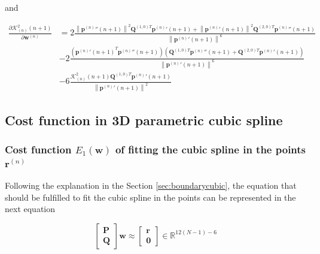 and

\begin{equation}\label{eq:curvature:der:K2nn1}
\begin{split}
\frac{
\partial 
\mathcal{K}_{(n)}^{2}(n+1)
}
{
\partial \mathbf{w}^{(n)}
}
& = 
2
\frac{
\left\|{\mathbf{p}^{(n)}}''(n+1)\right\|^2
\mathbf{Q}^{(1,0)T} {\mathbf{p}^{(n)}}'(n+1)
+
\left\|{\mathbf{p}^{(n)}}'(n+1)\right\|^2
\mathbf{Q}^{(2,0)T} {\mathbf{p}^{(n)}}''(n+1)
}
{\left\| {\mathbf{p}^{(n)}}'(n+1) \right\|^{6}}\\[10pt]
& - 
2
\frac
{
\left(
{{\mathbf{p}^{(n)}}'(n+1)}^{T}
{\mathbf{p}^{(n)}}''(n+1)
\right)
\left(
\mathbf{Q}^{(1,0)T}{\mathbf{p}^{(n)}}''(n+1)
+
\mathbf{Q}^{(2,0)T}{\mathbf{p}^{(n)}}'(n+1)
\right)
}
{\left\| {\mathbf{p}^{(n)}}'(n+1) \right\|^{6}}\\[10pt]
& - 
6
\frac
{
\mathcal{K}_{(n)}^{2}(n+1)
\mathbf{Q}^{(1,0)T}{\mathbf{p}^{(n)}}'(n+1)
}
{\left\| {\mathbf{p}^{(n)}}'(n+1) \right\|^{2}}
\end{split}
\end{equation}

\subsection{Cost function in 3D parametric cubic spline}

\subsubsection{Cost function $E_{1}(\mathbf{w})$ of fitting the cubic spline in the points $\mathbf{r}^{(n)}$}

Following the explanation in the Section \ref{sec:boundarycubic},
the equation that should be fulfilled to fit the cubic spline in the points can be represented in the next equation

\begin{equation}
\begin{bmatrix}
\mathbf{P}\\
\mathbf{Q}
\end{bmatrix}
\mathbf{w}
\approx
\begin{bmatrix}
\mathbf{r}\\
\mathbf{0}
\end{bmatrix}
\in \mathbb{R}^{12(N-1)-6}
\end{equation}

